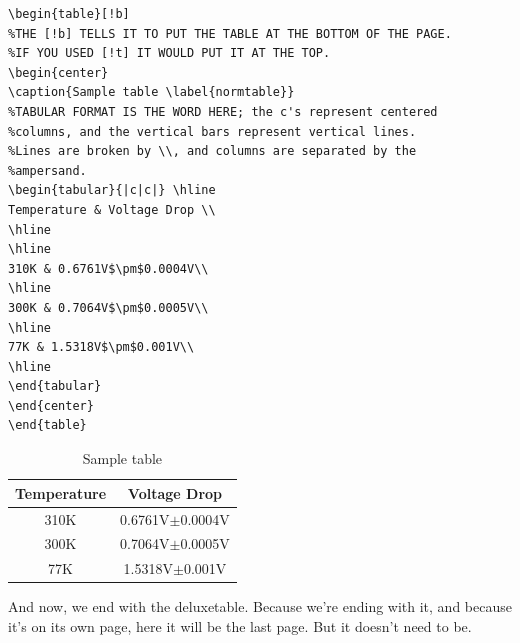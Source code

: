\documentclass[12pt,preprint]{aastex}
\begin{document}
\begin{verbatim}
\begin{table}[!b]
%THE [!b] TELLS IT TO PUT THE TABLE AT THE BOTTOM OF THE PAGE. 
%IF YOU USED [!t] IT WOULD PUT IT AT THE TOP.
\begin{center}
\caption{Sample table \label{normtable}}
%TABULAR FORMAT IS THE WORD HERE; the c's represent centered
%columns, and the vertical bars represent vertical lines. 
%Lines are broken by \\, and columns are separated by the
%ampersand.
\begin{tabular}{|c|c|} \hline
Temperature & Voltage Drop \\
\hline
\hline
310K & 0.6761V$\pm$0.0004V\\
\hline
300K & 0.7064V$\pm$0.0005V\\
\hline
77K & 1.5318V$\pm$0.001V\\
\hline
\end{tabular}
\end{center}
\end{table}
\end{verbatim}

\begin{table}[!b]
\begin{center}
\caption{Sample table \label{normtable}}
\begin{tabular}{|c|c|} \hline
Temperature & Voltage Drop \\
\hline
\hline
310K & 0.6761V$\pm$0.0004V\\
\hline
300K & 0.7064V$\pm$0.0005V\\
\hline
77K & 1.5318V$\pm$0.001V\\
\hline
\end{tabular}
\end{center}
\end{table}

\noindent And now, we end with the deluxetable. Because we're ending
 with it, and because it's on its own page, here it will be the last
page. But it doesn't need to be.
\end{document}
